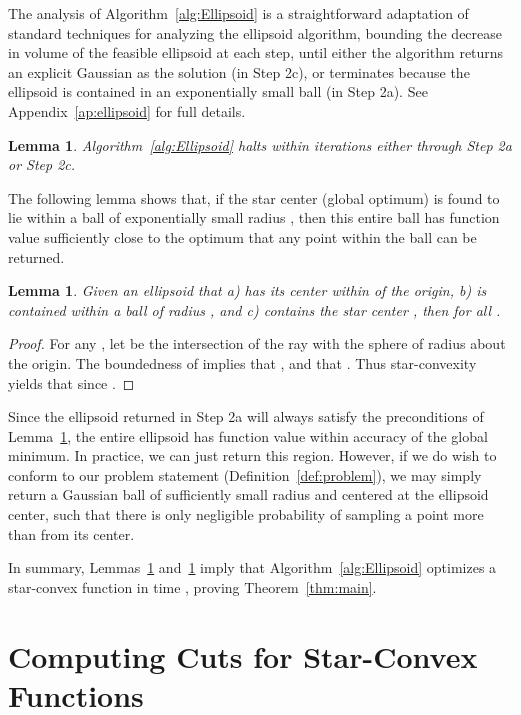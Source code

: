 \documentclass[11pt,letter]{article}
\newcounter{nTheorems}
\numberwithin{nTheorems}{section}
\newtheorem{lemma}[nTheorems]{Lemma}
\begin{document}
The analysis of Algorithm~\ref{alg:Ellipsoid} is a straightforward adaptation of standard techniques for analyzing the ellipsoid algorithm, bounding the decrease in volume of the feasible ellipsoid at each step, until either the algorithm returns an explicit Gaussian as the solution (in Step 2c), or terminates because the ellipsoid is contained in an exponentially small ball (in Step 2a). See Appendix~\ref{ap:ellipsoid} for full details.

\begin{lemma}
\label{lem:EllipsoidHalt}
Algorithm~\ref{alg:Ellipsoid} halts within  iterations either through Step 2a or Step 2c.
\end{lemma}



The following lemma shows that, if the star center (global optimum) is found to lie within a ball of exponentially small radius , then this entire ball has function value sufficiently close to the optimum that any point within the ball can be returned.

\begin{lemma}
\label{lem:TinyRadius}
Given an ellipsoid  that a) has its center within  of the origin, b) is contained within a ball of radius , and c) contains the star center , then  for all .
\end{lemma}

\begin{proof}
For any , let  be the intersection of the ray  with the sphere of radius  about the origin. The boundedness of  implies that , and that . Thus star-convexity yields that  since .
\end{proof}

Since the ellipsoid returned in Step 2a will always satisfy the preconditions of Lemma~\ref{lem:TinyRadius}, the entire ellipsoid has function value within  accuracy of the global minimum.
In practice, we can just return this region.
However, if we do wish to conform to our problem statement (Definition~\ref{def:problem}), we may simply return a Gaussian ball of sufficiently small radius and centered at the ellipsoid center, such that there is only negligible probability of sampling a point more than  from its center.

In summary, Lemmas~\ref{lem:EllipsoidHalt} and~\ref{lem:TinyRadius} imply that Algorithm~\ref{alg:Ellipsoid} optimizes a star-convex function in time , proving Theorem~\ref{thm:main}.

\section{Computing Cuts for Star-Convex Functions}
\label{sec:cuts}
\end{document}

